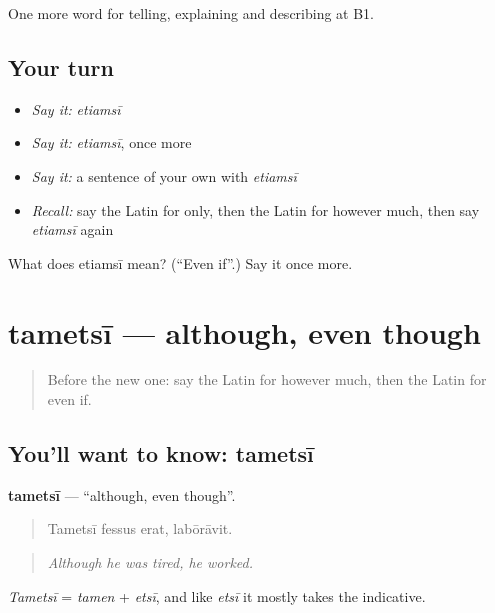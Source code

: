 \begin{grammarlens}[title={What you've built}]
One more word for telling, explaining and describing at B1.
\end{grammarlens}

\subsection*{Your turn}
\begin{itemize}
\raggedright
  \item \emph{Say it:} \emph{etiamsī}
  \item \emph{Say it:} \emph{etiamsī}, once more
  \item \emph{Say it:} a sentence of your own with \emph{etiamsī}
  \item \emph{Recall:} say the Latin for only, then the Latin for however much, then say \emph{etiamsī} again
\end{itemize}

\begin{tcolorbox}[breakable,colback=teal!4,colframe=teal!35!black,title={Before you move on}]
What does etiamsī mean? (\textquotedblleft{}Even if\textquotedblright{}.) Say it once more.
\end{tcolorbox}
\section[tametsī]{tametsī — although, even though}

\label{lesson:LA-C391-tametsi}



\begin{quote}
Before the new one: say the Latin for however much, then the Latin for even if.
\end{quote}

\subsection*{You'll want to know: tametsī}
\textbf{tametsī} — \textquotedblleft{}although, even though\textquotedblright{}.

\begin{quote}
Tametsī fessus erat, labōrāvit.
\end{quote}

\begin{quote}
\emph{Although he was tired, he worked.}
\end{quote}

\emph{Tametsī} = \emph{tamen} + \emph{etsī}, and like \emph{etsī} it mostly takes the indicative.

